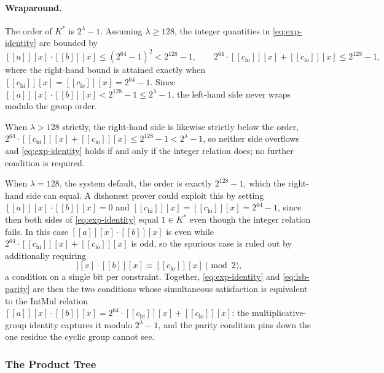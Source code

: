 \documentclass{article}
\theoremstyle{definition}
\newcommand{\intval}[1]{[\![#1]\!]}
\begin{document}
\paragraph{Wraparound.}
The order of $K^*$ is $2^\lambda - 1$. Assuming $\lambda \geq 128$, the integer quantities in \eqref{eq:exp-identity} are bounded by
\[
  \intval{a}[x] \cdot \intval{b}[x] \leq (2^{64} - 1)^2 < 2^{128} - 1, \qquad 2^{64} \cdot \intval{c_\text{hi}}[x] + \intval{c_\text{lo}}[x] \leq 2^{128} - 1,
\]
where the right-hand bound is attained exactly when $\intval{c_\text{hi}}[x] = \intval{c_\text{lo}}[x] = 2^{64} - 1$. Since $\intval{a}[x] \cdot \intval{b}[x] < 2^{128} - 1 \leq 2^\lambda - 1$, the left-hand side never wraps modulo the group order.

When $\lambda > 128$ strictly, the right-hand side is likewise strictly below the order, $2^{64} \cdot \intval{c_\text{hi}}[x] + \intval{c_\text{lo}}[x] \leq 2^{128} - 1 < 2^\lambda - 1$, so neither side overflows and \eqref{eq:exp-identity} holds if and only if the integer relation does; no further condition is required.

When $\lambda = 128$, the system default, the order is exactly $2^{128} - 1$, which the right-hand side can equal. A dishonest prover could exploit this by setting $\intval{a}[x] \cdot \intval{b}[x] = 0$ and $\intval{c_\text{hi}}[x] = \intval{c_\text{lo}}[x] = 2^{64} - 1$, since then both sides of \eqref{eq:exp-identity} equal $1 \in K^*$ even though the integer relation fails. In this case $\intval{a}[x] \cdot \intval{b}[x]$ is even while $2^{64} \cdot \intval{c_\text{hi}}[x] + \intval{c_\text{lo}}[x]$ is odd, so the spurious case is ruled out by additionally requiring
\begin{equation}
  \intval{a}[x] \cdot \intval{b}[x] \equiv \intval{c_\text{lo}}[x] \pmod 2,
  \label{eq:lsb-parity}
\end{equation}
a condition on a single bit per constraint. Together, \eqref{eq:exp-identity} and \eqref{eq:lsb-parity} are then the two conditions whose simultaneous satisfaction is equivalent to the IntMul relation $\intval{a}[x] \cdot \intval{b}[x] = 2^{64} \cdot \intval{c_\text{hi}}[x] + \intval{c_\text{lo}}[x]$: the multiplicative-group identity captures it modulo $2^\lambda - 1$, and the parity condition pins down the one residue the cyclic group cannot see.

\subsubsection{The Product Tree}
\label{sec:exp-subprotocols}
\end{document}
